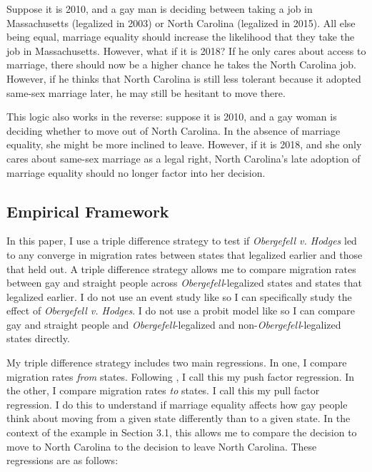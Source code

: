 \documentclass[12pt,letterpaper]{article}
\begin{document}
Suppose it is 2010, and a gay man is deciding between taking a job in Massachusetts (legalized in 2003) or North Carolina (legalized in 2015). All else being equal, marriage equality should increase the likelihood that they take the job in Massachusetts. However, what if it is 2018? If he only cares about access to marriage, there should now be a higher chance he takes the North Carolina job. However, if he thinks that North Carolina is still less tolerant because it adopted same-sex marriage later, he may still be hesitant to move there.

This logic also works in the reverse: suppose it is 2010, and a gay woman is deciding whether to move out of North Carolina. In the absence of marriage equality, she might be more inclined to leave. However, if it is 2018, and she only cares about same-sex marriage as a legal right, North Carolina’s late adoption of marriage equality should no longer factor into her decision. 


\subsection{Empirical Framework}

In this paper, I use a triple difference strategy to test if \textit{Obergefell v. Hodges} led to any converge in migration rates between states that legalized earlier and those that held out. A triple difference strategy allows me to compare migration rates between gay and straight people across \textit{Obergefell}-legalized states and states that legalized earlier. I do not use an event study like \citet{1} so I can specifically study the effect of \textit{Obergefell v. Hodges}. I do not use a probit model like \citet{12} so I can compare gay and straight people and \textit{Obergefell}-legalized and non-\textit{Obergefell}-legalized states directly.

My triple difference strategy includes two main regressions. In one, I compare migration rates \textit{from} states. Following \citet{12}, I call this my push factor regression. In the other, I compare migration rates \textit{to} states. I call this my pull factor regression. I do this to understand if marriage equality affects how gay people think about moving from a given state differently than to a given state. In the context of the example in Section 3.1, this allows me to compare the decision to move to North Carolina to the decision to leave North Carolina. These regressions are as follows:
\end{document}

